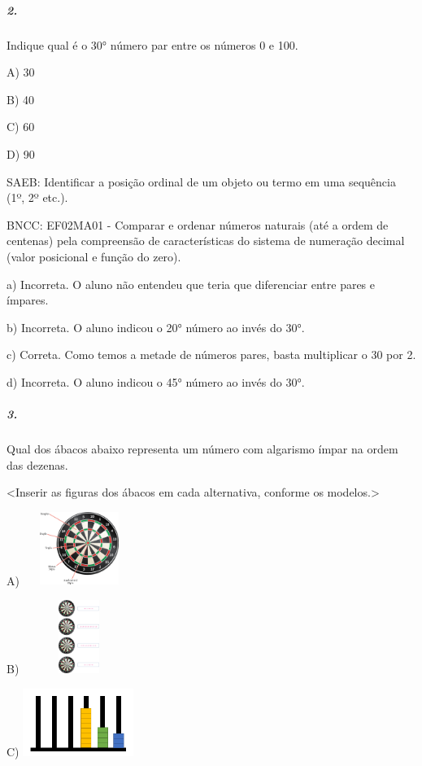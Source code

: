\subparagraph{2. }\label{section-12}

Indique qual é o 30° número par entre os números 0 e 100.

A) 30

B) 40

C) 60

D) 90

SAEB: Identificar a posição ordinal de um objeto ou termo em uma sequência (1º, 2º etc.).

BNCC: EF02MA01 - Comparar e ordenar números naturais (até a ordem de centenas) pela compreensão de características do sistema de numeração decimal (valor
posicional e função do zero).

a) Incorreta. O aluno não entendeu que teria que diferenciar entre pares
e ímpares.

b) Incorreta. O aluno indicou o 20° número ao invés do 30°.

c) Correta. Como temos a metade de números pares, basta multiplicar o 30 por 2.

d) Incorreta. O aluno indicou o 45° número ao invés do 30°.

\subparagraph{3. }\label{section-13}

Qual dos ábacos abaixo representa um número com algarismo ímpar na ordem
das dezenas.

\textless{}Inserir as figuras dos ábacos em cada alternativa, conforme
os modelos.\textgreater{}

A) \includegraphics[width=1.42708in,height=0.93377in]{media/image24.png}

B) \includegraphics[width=1.43685in,height=0.93657in]{media/image25.png}

C) \includegraphics[width=1.41667in,height=0.86777in]{media/image26.png}

